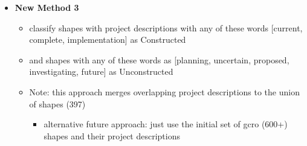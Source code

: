 \documentclass[12pt]{article}
\begin{document}
\begin{itemize}
    \item \textbf{New Method 3}
        \begin{itemize}
            \item classify shapes with project descriptions with any of these words [current, complete, implementation] as Constructed 
            \item and shapes with any of these words as [planning, uncertain, proposed, investigating, future] as Unconstructed 
            \item Note: this approach merges overlapping project descriptions to the union of shapes (397) 
                \begin{itemize}
                    \item alternative future approach: just use the initial set of gcro (600+) shapes and their project descriptions
                \end{itemize}
        \end{itemize}
\end{itemize}
\end{document}
